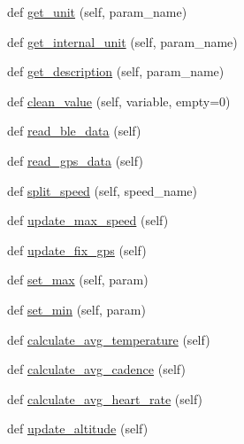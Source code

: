 \begin{DoxyCompactItemize}
\item 
def \hyperlink{classride__parameters_1_1ride__parameters_a8108dcab38d0a57e363da69ce383038e}{get\+\_\+unit} (self, param\+\_\+name)
\item 
def \hyperlink{classride__parameters_1_1ride__parameters_a5f1472b2156773cecd43da4ade606fd1}{get\+\_\+internal\+\_\+unit} (self, param\+\_\+name)
\item 
def \hyperlink{classride__parameters_1_1ride__parameters_a3fd3198dfcd50bbcafcaac194339e3a5}{get\+\_\+description} (self, param\+\_\+name)
\item 
def \hyperlink{classride__parameters_1_1ride__parameters_ac05416d0080d15decb714bdbd68dfeef}{clean\+\_\+value} (self, variable, empty=0)
\item 
def \hyperlink{classride__parameters_1_1ride__parameters_a41a11edd11c4c3088597ef48583fe5ec}{read\+\_\+ble\+\_\+data} (self)
\item 
def \hyperlink{classride__parameters_1_1ride__parameters_a7b3691fb41527f59f5d2bb1b537d842d}{read\+\_\+gps\+\_\+data} (self)
\item 
def \hyperlink{classride__parameters_1_1ride__parameters_ac92ac15cba00fe7c440cb887966ad9ae}{split\+\_\+speed} (self, speed\+\_\+name)
\item 
def \hyperlink{classride__parameters_1_1ride__parameters_a18c56686f5b82a73482130fbaadc9bc7}{update\+\_\+max\+\_\+speed} (self)
\item 
def \hyperlink{classride__parameters_1_1ride__parameters_a9807fc1da341854145ce767ab5c30a03}{update\+\_\+fix\+\_\+gps} (self)
\item 
def \hyperlink{classride__parameters_1_1ride__parameters_aa9a8380985766a4055005d900d4ba88c}{set\+\_\+max} (self, param)
\item 
def \hyperlink{classride__parameters_1_1ride__parameters_a158b11d8e0c003428a576925a1bc3a06}{set\+\_\+min} (self, param)
\item 
def \hyperlink{classride__parameters_1_1ride__parameters_a1e1f51a19a57e25581e7c68bdc223220}{calculate\+\_\+avg\+\_\+temperature} (self)
\item 
def \hyperlink{classride__parameters_1_1ride__parameters_a118d405141974f9cdd157c99632750e7}{calculate\+\_\+avg\+\_\+cadence} (self)
\item 
def \hyperlink{classride__parameters_1_1ride__parameters_a7cdd705426c5a6b3e14c84d6ca4e8315}{calculate\+\_\+avg\+\_\+heart\+\_\+rate} (self)
\item 
def \hyperlink{classride__parameters_1_1ride__parameters_ac43553319b5a7bf338055b4a4e7ad6f8}{update\+\_\+altitude} (self)

\end{DoxyCompactItemize}
